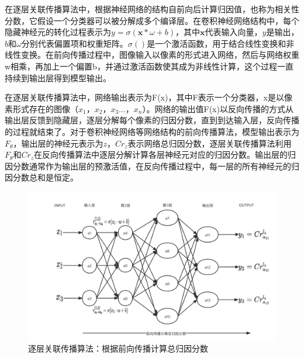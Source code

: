 在逐层关联传播算法中，根据神经网络的结构自前向后计算归因值，也称为相关性分数，它假设一个分类器可以被分解成多个编译层。在卷积神经网络结构中，每个隐藏神经元的转化过程表示为$y=\sigma(\mathbf{x} * \omega+b)$，其中$\mathbf{x}$代表输入向量，$y$是输出，$b$和$\omega$分别代表{}偏置项和权重矩阵。$\sigma()$是一个激活函数，用于结合线性变换和非线性变换。在前向传播过程中，图像输入以像素的形式进入网络，然后与网络权重w相乘，再加上一个偏置b，并通过激活函数使其成为非线性计算，这个过程一直持续到输出层得到模型输出。

在逐层关联传播算法中，网络输出表示为F(x)，其中F表示一个分类器，x是以像素形式存在的图像（$x_{1}$，$x_{2}$，$x_{3}$...，$x_{n}$）。网络的输出值F(x)以反向传播的方式从输出层反馈到隐藏层，逐层分解每个像素的归因分数，直到到达输入层，反向传播的过程就结束了。对于卷积神经网络等网络结构的前向传播算法，模型输出表示为$F_{\theta}$，输出层的神经元表示为$z$，$Cr_{z}$表示网络总归因分数，逐层关联传播算法利用$F_{\theta}$和$Cr_{z}$在反向传播算法中逐层分解计算各层神经元对应的归因分数。输出层的归因分数通常作为输出层的预激活值，在反向传播过程中，每一层的所有神经元的归因分数总和是恒定。

\begin{figure}[!hbt]
\centering
	\includegraphics[scale=0.22]{fig2/C3/自适应-前向传播}%
	\caption{逐层关联传播算法：根据前向传播计算总归因分数}
	\label{fig:逐层关联传播算法：根据前向传播计算总归因分数}	
\end{figure}

